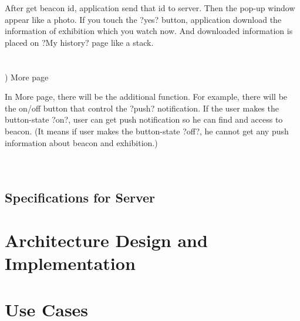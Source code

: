 \documentclass[conference]{IEEEtran}
\begin{document}
After get beacon id, application send that id to server. Then the pop-up window appear like a photo. If you touch the ?yes? button, application download the information of exhibition which you watch now. And downloaded information is placed on ?My history? page like a stack.\\\\\\

) More page

In More page, there will be the additional function. For example, there will be the on/off button that control the ?push? notification. If the user makes the button-state ?on?, user can get push notification so he can find and access to beacon. (It means if user makes the button-state ?off?, he cannot get any push information about beacon and exhibition.) \\\\\\
\subsection{Specifications for Server}


\section{Architecture Design and Implementation}

\section{Use Cases}





%
%
\end{document}
